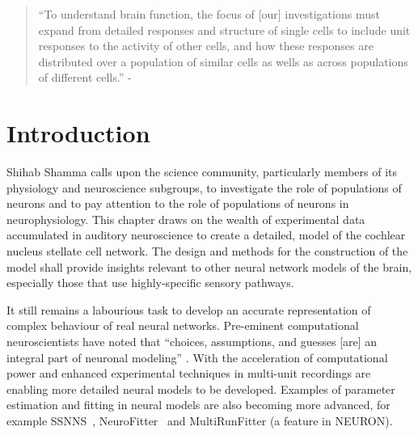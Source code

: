 
\begin{quotation}
  ``To understand brain function, the focus of [our] investigations must expand from detailed responses and structure of single cells to include unit responses to the activity of other cells, and how these responses are distributed over a population of similar cells as wells as across populations  of different cells.''
- \textit{\citet[p.]{Shamma:1998}}
\end{quotation}


\section{Introduction    \label{sec:CN:introduction}}

Shihab Shamma calls upon the science community, particularly members of its physiology and neuroscience subgroups, to investigate the role of populations of neurons and to pay attention to the role of populations of neurons in neurophysiology.
This chapter draws on the wealth of experimental data accumulated in auditory neuroscience to create a detailed, \BNN model of the cochlear nucleus stellate cell network.
The design and methods for the construction of the model shall provide insights relevant to other neural network models of the brain, especially those that use highly-specific sensory pathways.

It still remains a labourious task to develop an accurate representation of complex behaviour of real neural networks.
Pre-eminent computational neuroscientists have noted that ``choices, assumptions, and guesses [are] an integral part of neuronal modeling'' \citep{SegevBurkeEtAl:1998}.
With the acceleration of computational power and enhanced experimental techniques in multi-unit recordings are enabling more detailed neural models to be developed.
Examples of parameter estimation and fitting in neural models are
also becoming more advanced, for example SSNNS~\citep{SichtigSchafferEtAl:2008}, NeuroFitter \citep{VanAchardEtAl:2007}~and MultiRunFitter (a feature in NEURON).



